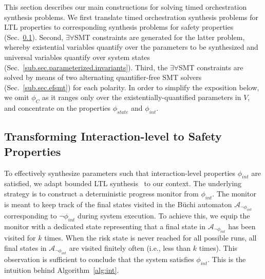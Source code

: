 
This section describes our main constructions for solving timed orchestration synthesis problems.
We first translate timed orchestration synthesis problems for LTL
properties to corresponding synthesis problems for safety properties
(Sec.~\ref{sub.sec.monitor})\@. Second,
$\exists\forall$SMT constraints are generated for the latter problem, whereby existential 
variables quantify over the parameters to be synthesized and universal variables quantify over system states
(Sec.~\ref{sub.sec.parameterized.invariants}). 
Third, the 
$\exists\forall$SMT constraints are solved by means of two alternating quantifier-free SMT solvers (Sec.~\ref{sub.sec.efsmt}) for each polarity\@.
In order to simplify the exposition below, we omit $\phi_C$ as it ranges only over the existentially-quantified parameters  in $V$, and 
concentrate on the properties $\phi_{state}$ and $\phi_{int}$\@. 



\subsection{Transforming Interaction-level to Safety Properties}\label{sub.sec.monitor}

To effectively synthesize parameters such that interaction-level
properties $\phi_{int}$ are satisfied, we adapt bounded
LTL synthesis~\cite{ScheweF07a} to our context. The underlying
strategy is to construct a deterministic progress monitor from
$\phi_{int}$.  The monitor is meant to keep track of the final states
visited in the B\"uchi automaton $\mathcal{A}_{\neg \phi_{int}}$
corresponding to $\neg\phi_{int}$ during system execution. To achieve
this, we equip the monitor with a dedicated  state
representing that a final state in $\mathcal{A}_{\neg \phi_{int}}$ has
been visited for $k$ times. When the risk state is never reached for
all possible runs, all final states in $\mathcal{A}_{\neg \phi_{int}}$
are visited finitely often (i.e., less than $k$ times). This
observation is sufficient to conclude that the system satisfies
$\phi_{int}$. This is the intuition behind Algorithm~\ref{alg:int}.

